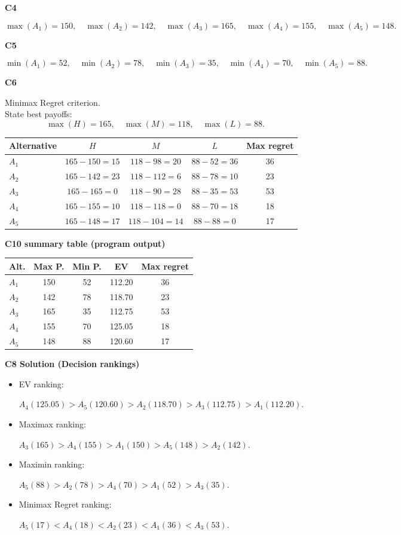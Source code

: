 \begin{ExamProblems}
		\textbf{C4}\par
				\[
		\max(A_1)=150,\quad \max(A_2)=142,\quad \max(A_3)=165,\quad \max(A_4)=155,\quad \max(A_5)=148.
		\]
		

		\textbf{C5}\par
				\[
		\min(A_1)=52,\quad \min(A_2)=78,\quad \min(A_3)=35,\quad \min(A_4)=70,\quad \min(A_5)=88.
		\]

		\textbf{C6}\par
		Minimax Regret criterion.\\
				State best payoffs:
		\[
		\max(H)=165,\quad \max(M)=118,\quad \max(L)=88.
		\]
		\begin{center}
			\begin{tabular}{l c c c c}
				\toprule
				Alternative & $H$ & $M$ & $L$ & Max regret \\
				\midrule
				$A_1$ & $165-150=15$ & $118-98=20$ & $88-52=36$ & 36 \\
				$A_2$ & $165-142=23$ & $118-112=6$ & $88-78=10$ & 23 \\
				$A_3$ & $165-165=0$ & $118-90=28$ & $88-35=53$ & 53 \\
				$A_4$ & $165-155=10$ & $118-118=0$ & $88-70=18$ & 18 \\
				$A_5$ & $165-148=17$ & $118-104=14$ & $88-88=0$ & 17 \\
				\bottomrule
			\end{tabular}
		\end{center}
		

		\textbf{C10 summary table (program output)}\par
		\begin{center}
			\begin{tabular}{l c c c c}
				\hline
				Alt. & Max P. & Min P. & EV & Max regret \\
				\hline
				$A_1$ & 150 & 52 & 112.20 & 36 \\
				$A_2$ & 142 & 78 & 118.70 & 23 \\
				$A_3$ & 165 & 35 & 112.75 & 53 \\
				$A_4$ & 155 & 70 & 125.05 & 18 \\
				$A_5$ & 148 & 88 & 120.60 & 17 \\
				\hline
			\end{tabular}
		\end{center}
		
		\textbf{C8 Solution (Decision rankings)}\par
		\begin{itemize}
			\item EV ranking: \par $A_4(125.05)>A_5(120.60)>A_2(118.70)>A_3(112.75)>A_1(112.20)$.
			\item Maximax ranking:\par $A_3(165)>A_4(155)>A_1(150)>A_5(148)>A_2(142)$.
			\item Maximin ranking: \par $A_5(88)>A_2(78)>A_4(70)>A_1(52)>A_3(35)$.
			\item Minimax Regret ranking:\par $A_5(17)<A_4(18)<A_2(23)<A_1(36)<A_3(53)$.
		\end{itemize}
		

\end{ExamProblems}
